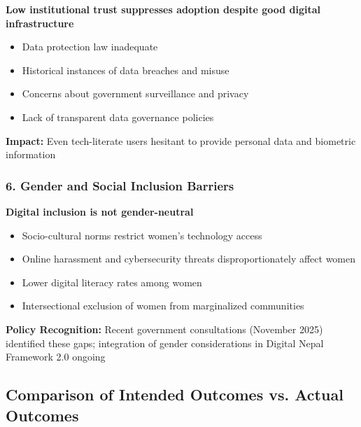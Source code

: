 \documentclass[12pt,a4paper]{article}
\begin{document}
\textbf{Low institutional trust suppresses adoption despite good digital infrastructure}
\begin{itemize}
    \item Data protection law inadequate
    \item Historical instances of data breaches and misuse
    \item Concerns about government surveillance and privacy
    \item Lack of transparent data governance policies
\end{itemize}

\textbf{Impact:} Even tech-literate users hesitant to provide personal data and biometric information

\subsubsection{6. Gender and Social Inclusion Barriers}

\textbf{Digital inclusion is not gender-neutral}
\begin{itemize}
    \item Socio-cultural norms restrict women's technology access
    \item Online harassment and cybersecurity threats disproportionately affect women
    \item Lower digital literacy rates among women
    \item Intersectional exclusion of women from marginalized communities
\end{itemize}

\textbf{Policy Recognition:} Recent government consultations (November 2025) identified these gaps; integration of gender considerations in Digital Nepal Framework 2.0 ongoing

\subsection{Comparison of Intended Outcomes vs. Actual Outcomes}
\end{document}
